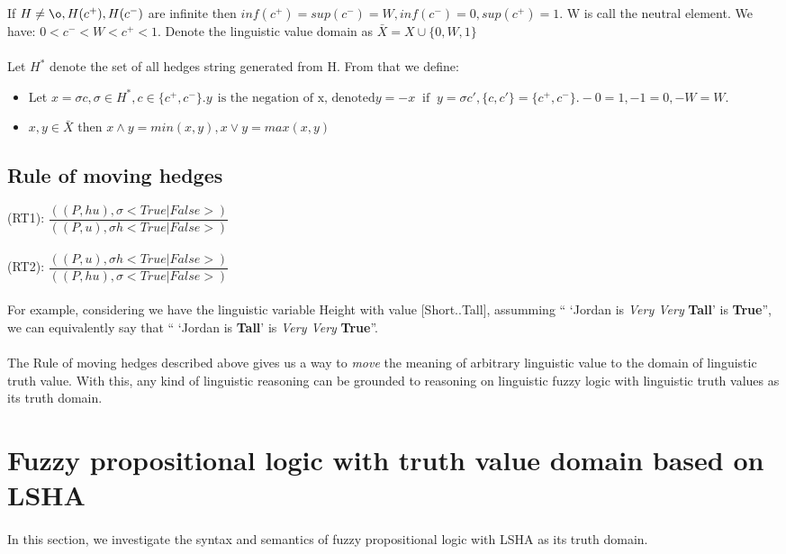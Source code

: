 \documentclass[part1.tex]{subfiles}
\begin{document}
If \(H \neq {\o}, H(c^+), H(c^-)\) are infinite then \(inf(c^+) = sup(c^-) = W, inf(c^-) = 0, sup(c^+) = 1\). W is call the neutral element. We have: \(0<c^-<W<c^+<1\). Denote the linguistic value domain as
\(\bar X = X \cup \{0,W,1\}\)\\\\

Let $H^{*}$ denote the set of all hedges string generated from H.
From that we define:
\begin{itemize}
\item Let \(x = \sigma c, \sigma \in H^*, c \in \{c^+, c^-\}.
        y\:\: \text{is the negation of x, denoted}
	y = -x\: \text{ if }\: y = \sigma c', \{c,c'\} = \{c^+, c^-\}. -0 = 1, -1 = 0, -W = W\).
\item \(x,y \in \bar X\) then \(x \wedge y = min(x,y), x \vee y = max(x,y)\)
\end{itemize}


\subsection{Rule of moving hedges}
\indent (RT1): \(\dfrac{((P,hu),\sigma <True|False>)} {((P,u),\sigma h<True|False>)}\)
\\
\\
	(RT2): \(\dfrac{((P,u),\sigma h<True|False>)} {((P,hu),\sigma <True|False>)}\)
\paragraph{} For example, considering we have the linguistic
variable Height with value [Short..Tall], assumming `` `Jordan is
{\em Very Very} {\bf Tall}' is {\bf True}'', we can equivalently
say that `` `Jordan is {\bf Tall}' is {\em Very Very} {\bf
True}''. 
\paragraph{} The Rule of moving hedges described above gives us a
way to {\em move} the meaning of arbitrary linguistic value to
the domain of linguistic truth value. With this, any kind of
linguistic reasoning can be grounded to reasoning on linguistic
fuzzy logic with linguistic truth values as its truth domain.
\section{Fuzzy propositional logic with truth value domain based on
LSHA}
\paragraph{} In this section, we investigate the syntax and
semantics of fuzzy propositional logic with LSHA as its truth
domain. 
\end{document}
